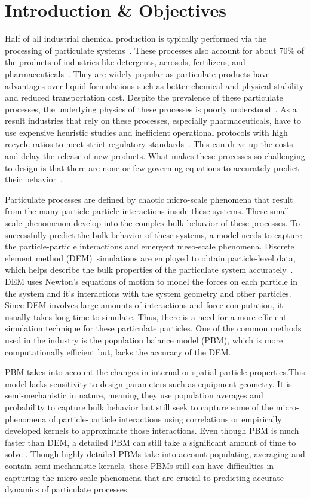 \documentclass[preprint,11pt,authoryear]{elsarticle}
\begin{document}
\section{Introduction \& Objectives} 
Half of all industrial chemical production is typically performed via the
processing of particulate systems~\citep{seville1997}. These processes 
also account
for about 70\% of the products of industries like detergents, aerosols,
fertilizers, and pharmaceuticals~\citep{Litster2016}. They are
widely popular as particulate products have advantages over liquid
formulations such as better chemical and physical stability and reduced
transportation cost. Despite the prevalence of these particulate processes,
the underlying physics of these processes is poorly
understood~\citep{Rogers2013}. As a result industries that rely on these
processes, especially pharmaceuticals, have to use expensive heuristic studies
and inefficient operational protocols with high recycle ratios to meet strict
regulatory standards~\citep{Ramachandran2009}. This can drive up the costs and
delay the release of new products. What makes these processes so challenging
to design is that there are none or few governing equations to accurately
predict their behavior~\citep{sen2013}.

Particulate processes are defined by chaotic micro-scale phenomena that result
from the many particle-particle interactions inside these systems. These small
scale phenomenon develop into the complex bulk behavior of these processes. To
successfully predict the bulk behavior of these systems, a model needs to
capture the particle-particle interactions and emergent meso-scale phenomena. 
Discrete element method (DEM)~\citep{Cundall1979}simulations are employed 
to obtain particle-level data, which helps describe the bulk properties 
of the particulate system accurately~\citep{Hancock2011}. DEM uses Newton's 
equations of motion to model the forces on each particle in the system and 
it's interactions with the system geometry and other particles. Since DEM
involves large amounts of interactions and force computation, it usually takes
long time to simulate. Thus, there is a need for a more efficient
simulation technique for these particulate particles. One of the common
methods used in the industry is the population balance model (PBM), which is
more computationally efficient but, lacks the accuracy of the DEM.

PBM takes into account the changes in internal or spatial particle
properties.This model lacks sensitivity to design parameters such as equipment
geometry. It is semi-mechanistic in nature, meaning they use population
averages and probability to capture bulk behavior but still seek to capture
some of the micro-phenomena of particle-particle interactions using
correlations or empirically developed kernels to approximate those
interactions. Even though PBM is much faster than DEM, a detailed PBM can
still take a significant amount of time to solve \citep{Barrasso2013}. 
Though highly detailed PBMs take into account
populating, averaging and contain semi-mechanistic kernels, these PBMs still
can have difficulties in capturing the micro-scale phenomena that are crucial
to predicting accurate dynamics of particulate processes.
\end{document}
